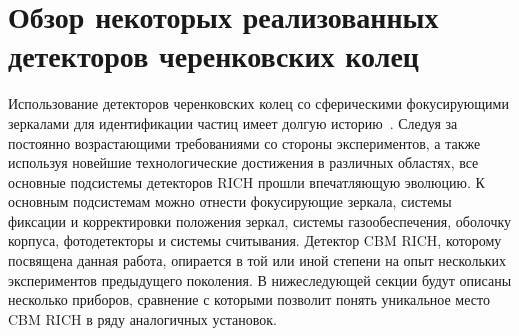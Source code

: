 

\section{Обзор некоторых реализованных детекторов черенковских колец}\label{sec:secRiches}

Использование детекторов черенковских колец со сферическими фокусирующими зеркалами для идентификации частиц имеет долгую историю~\cite{}. Следуя за постоянно возрастающими требованиями со стороны экспериментов, а также используя новейшие технологические достижения в различных областях, все основные подсистемы детекторов RICH прошли впечатляющую эволюцию. К основным подсистемам можно отнести фокусирующие зеркала, системы фиксации и корректировки положения зеркал, системы газообеспечения, оболочку корпуса, фотодетекторы и системы считывания. Детектор CBM RICH, которому посвящена данная работа, опирается в той или иной степени на опыт нескольких экспериментов предыдущего поколения. В нижеследующей секции будут описаны несколько приборов, сравнение с которыми позволит понять уникальное место CBM RICH в ряду аналогичных установок.


